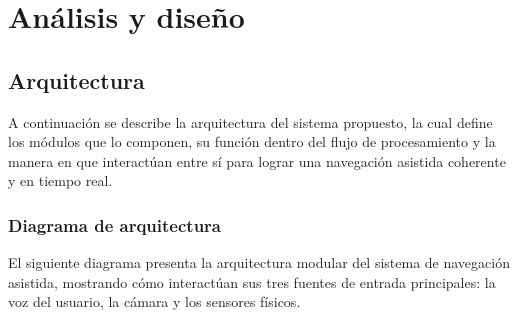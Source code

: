 \chapter{Análisis y diseño}







\section{Arquitectura}

A continuación se describe la arquitectura del sistema propuesto, la cual define los módulos que lo componen, su función dentro del flujo de procesamiento y la manera en que interactúan entre sí para lograr una navegación asistida coherente y en tiempo real.

\subsection{Diagrama de arquitectura}

El siguiente diagrama presenta la arquitectura modular del sistema de navegación asistida, mostrando cómo interactúan sus tres fuentes de entrada principales: la voz del usuario, la cámara y los sensores físicos. 

